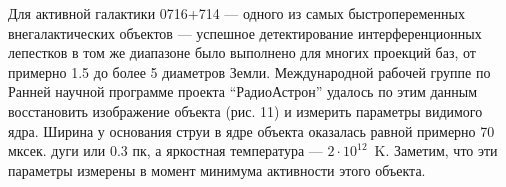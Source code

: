 Для активной галактики 0716+714 --- одного из самых быстропеременных
внегалактических объектов --- успешное детектирование интерференционных
лепестков в том же диапазоне было выполнено для многих проекций баз,
от примерно 1.5 до более 5 диаметров Земли. Международной рабочей группе по
Ранней научной программе проекта ``РадиоАстрон'' удалось по этим данным
восстановить изображение объекта (рис. 11) и измерить параметры видимого
ядра. Ширина у основания струи в ядре объекта оказалась равной примерно
70 мксек. дуги или 0.3 пк, а яркостная температура
--- $2 \cdot 10^{12}$~K. Заметим, что эти параметры измерены в момент
минимума активности этого объекта.
